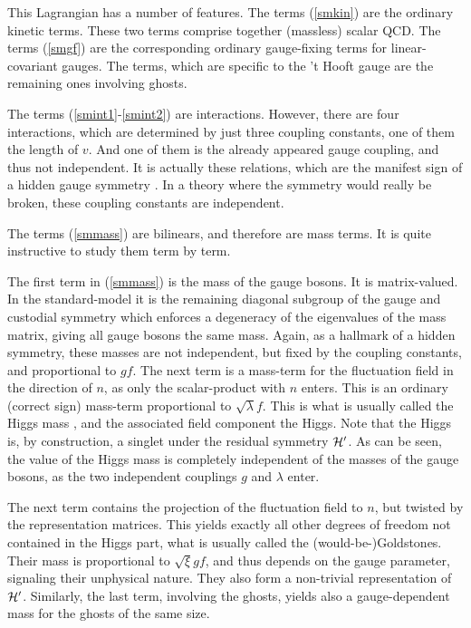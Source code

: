 \documentclass[final,12pt,3p,longtitle]{elsarticle}
\newcommand*{\pref}[1]{(\ref{#1})}
\newcommand*{\prefr}[2]{(\ref{#1}-\ref{#2})}
\newcommand*{\1}{1\!\!\!\bot}
\begin{document}
This Lagrangian has a number of features. The terms \pref{smkin} are the ordinary kinetic terms. These two terms comprise together (massless) scalar QCD. The terms \pref{smgf} are the corresponding ordinary gauge-fixing terms for linear-covariant gauges. The terms, which are specific to the 't Hooft gauge are the remaining ones involving ghosts.

The terms \prefr{smint1}{smint2} are interactions. However, there are four interactions, which are determined by just three coupling constants, one of them the length of $v$. And one of them is the already appeared gauge coupling, and thus not independent. It is actually these relations, which are the manifest sign of a hidden gauge symmetry \cite{O'Raifeartaigh:1978kv}. In a theory where the symmetry would really be broken, these coupling constants are independent.

The terms \pref{smmass} are bilinears, and therefore are mass terms. It is quite instructive to study them term by term.

The first term in \pref{smmass} is the mass of the gauge bosons. It is matrix-valued. In the standard-model it is the remaining diagonal subgroup of the gauge and custodial symmetry which enforces a degeneracy of the eigenvalues of the mass matrix, giving all gauge bosons the same mass. Again, as a hallmark of a hidden symmetry, these masses are not independent, but fixed by the coupling constants, and proportional to $gf$. The next term is a mass-term for the fluctuation field in the direction of $n$, as only the scalar-product with $n$ enters. This is an ordinary (correct sign) mass-term proportional to $\sqrt{\lambda}f$. This is what is usually called the Higgs mass \cite{pdg,Bohm:2001yx}, and the associated field component the Higgs. Note that the Higgs is, by construction, a singlet under the residual symmetry ${\cal H}'$. As can be seen, the value of the Higgs mass is completely independent of the masses of the gauge bosons, as the two independent couplings $g$ and $\lambda$ enter.

The next term contains the projection of the fluctuation field to $n$, but twisted by the representation matrices. This yields exactly all other degrees of freedom not contained in the Higgs part, what is usually called the (would-be-)Goldstones. Their mass is proportional to $\sqrt{\xi}gf$, and thus depends on the gauge parameter, signaling their unphysical nature. They also form a non-trivial representation of ${\cal H}'$. Similarly, the last term, involving the ghosts, yields also a gauge-dependent mass for the ghosts of the same size.
\end{document}
